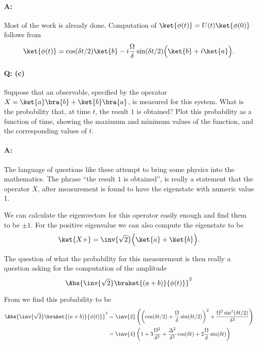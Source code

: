 {\paragraph{A:}
Most of the work is already done.  Computation of \(\ket{\phi(t)} = U(t) \ket{\phi(0)}\) follows from 
\begin{equation}\label{eqn:qmIexamPractice2008Dec:2:110}
\ket{\phi(t)} =
\cos(\delta t/2) \ket{b}
- i \frac{\Omega}{\delta} \sin(\delta t/2) \Bigl(
\ket{b} +i \ket{a}
\Bigr).
\end{equation}

\paragraph{Q: (c)}

Suppose that an observable, specified by the operator \(X = \ket{a}\bra{b} + \ket{b}\bra{a}\), is measured for this system.  What is the probability that, at time \(t\), the result \(1\) is obtained?  Plot this probability as a function of time, showing the maximum and minimum values of the function, and the corresponding values of \(t\).

\paragraph{A:}

The language of questions like these attempt to bring some physics into the mathematics.  The phrase ``the result \(1\) is obtained'', is really a statement that the operator \(X\), after measurement is found to have the eigenstate with numeric value 1.

We can calculate the eigenvectors for this operator easily enough and find them to be \(\pm 1\).  For the positive eigenvalue we can also compute the eigenstate to be
%
\begin{equation}\label{eqn:qmIexamPractice2008Dec:2:120}
\ket{X+} = \inv{\sqrt{2}} \Bigl( \ket{a} + \ket{b} \Bigr).
\end{equation}

The question of what the probability for this measurement is then really a question asking for the computation of the amplitude
%
\begin{equation}\label{eqn:qmIexamPractice2008Dec:2:130}
\Abs{
\inv{\sqrt{2}}
\braket{
 (a + b)}{\phi(t)}}^2
\end{equation}

From  we find this probability to be
%
\begin{equation}\label{eqn:qmIexamPractice2008Dec:710}
\begin{aligned}
\Abs{
\inv{\sqrt{2}}
\braket{
 (a + b)}{\phi(t)}}^2
&=
\inv{2} \left(
\left(\cos(\delta t/2) + \frac{\Omega}{\delta} \sin(\delta t/2)\right)^2
+ \frac{ \Omega^2 \sin^2(\delta t/2)}{\delta^2}
\right) \\
&=
\inv{4} \left( 1 + 3 \frac{\Omega^2}{\delta^2} + \frac{\Delta^2}{\delta^2} \cos (\delta t) + 2 \frac{ \Omega}{\delta} \sin(\delta t) \right)
\end{aligned}
\end{equation}

}
